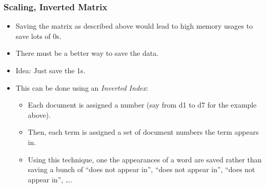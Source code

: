 \documentclass[a4paper, 11pt, accentcolor = tud3b]{tudreport}
\begin{document}
                \subsubsection{Scaling, Inverted Matrix} %
                	\begin{itemize}
                		\item Saving the matrix as described above would lead to high memory usages to save lots of 0s.
                		\item There must be a better way to save the data.
                		\item Idea: Just save the 1s.
                		\item This can be done using an \textit{Inverted Index}:
                			\begin{itemize}
                				\item Each document is assigned a number (say from d1 to d7 for the example above).
                				\item Then, each term is assigned a set of document numbers the term appears in.
                				\item Using this technique, one the appearances of a word are saved rather than saving a bunch of \enquote{does not appear in}, \enquote{does not appear in}, \enquote{does not appear in}, \dots.
                			\end{itemize}
                	\end{itemize}
                
\end{document}
